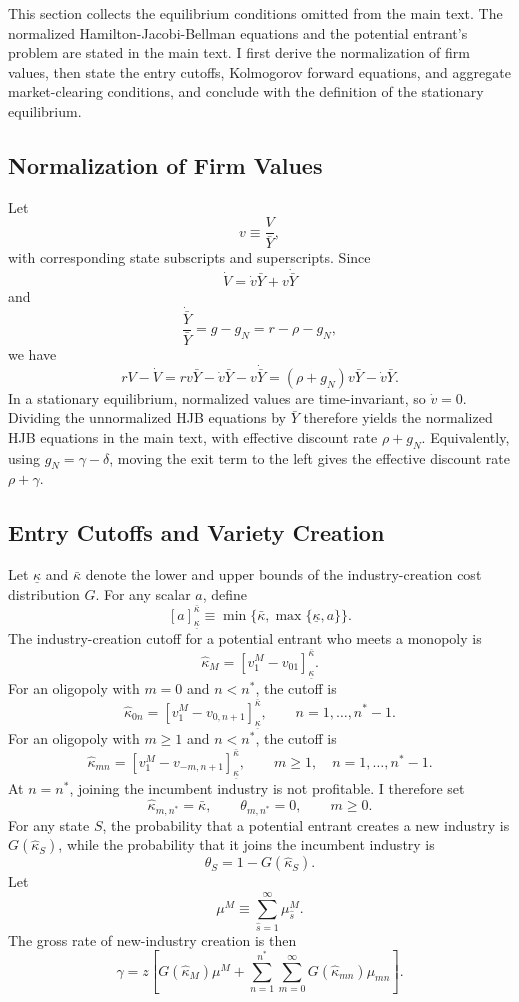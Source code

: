 \documentclass[12pt]{article}
\begin{document}
This section collects the equilibrium conditions omitted from the main text. The normalized Hamilton-Jacobi-Bellman equations and the potential entrant's problem are stated in the main text. I first derive the normalization of firm values, then state the entry cutoffs, Kolmogorov forward equations, and aggregate market-clearing conditions, and conclude with the definition of the stationary equilibrium.

\subsection{Normalization of Firm Values}\label{app:HJB_normalization}

Let
\[
v \equiv \frac{V}{\bar Y},
\]
with corresponding state subscripts and superscripts. Since
\[
\dot V=\dot v \bar Y+v\dot{\bar Y}
\]
and
\[
\frac{\dot{\bar Y}}{\bar Y}=g-g_N=r-\rho-g_N,
\]
we have
\[
rV-\dot V
=
rv\bar Y-\dot v\bar Y-v\dot{\bar Y}
=
(\rho+g_N)v\bar Y-\dot v\bar Y.
\]
In a stationary equilibrium, normalized values are time-invariant, so \(\dot v=0\).
Dividing the unnormalized HJB equations by \(\bar Y\) therefore yields the normalized
HJB equations in the main text, with effective discount rate \(\rho+g_N\). Equivalently,
using \(g_N=\gamma-\delta\), moving the exit term to the left gives the effective discount
rate \(\rho+\gamma\).

\subsection{Entry Cutoffs and Variety Creation}\label{app:entry_cutoffs}

Let \(\underline{\kappa}\) and \(\bar{\kappa}\) denote the lower and upper bounds of the
industry-creation cost distribution \(G\). For any scalar \(a\), define
\[
[a]_{\underline{\kappa}}^{\bar{\kappa}}
\equiv
\min\{\bar{\kappa},\max\{\underline{\kappa},a\}\}.
\]
The industry-creation cutoff for a potential entrant who meets a monopoly is
\[
\hat{\kappa}_M
=
[v^M_1-v_{01}]_{\underline{\kappa}}^{\bar{\kappa}}.
\]
For an oligopoly with \(m=0\) and \(n<n^*\), the cutoff is
\[
\hat{\kappa}_{0n}
=
[v^M_1-v_{0,n+1}]_{\underline{\kappa}}^{\bar{\kappa}},
\qquad n=1,\ldots,n^*-1.
\]
For an oligopoly with \(m\geq 1\) and \(n<n^*\), the cutoff is
\[
\hat{\kappa}_{mn}
=
[v^M_1-v_{-m,n+1}]_{\underline{\kappa}}^{\bar{\kappa}},
\qquad m\geq 1,\quad n=1,\ldots,n^*-1.
\]
At \(n=n^*\), joining the incumbent industry is not profitable. I therefore set
\[
\hat{\kappa}_{m,n^*}=\bar{\kappa},
\qquad
\theta_{m,n^*}=0,
\qquad m\geq 0.
\]
For any state \(S\), the probability that a potential entrant creates a new industry is
\(G(\hat{\kappa}_S)\), while the probability that it joins the incumbent industry is
\[
\theta_S=1-G(\hat{\kappa}_S).
\]
Let
\[
\mu^M \equiv \sum_{\hat s=1}^{\infty}\mu^M_{\hat s}.
\]
The gross rate of new-industry creation is then
\[
\gamma
=
z\left[
G(\hat{\kappa}_M)\mu^M
+
\sum_{n=1}^{n^*}\sum_{m=0}^{\infty}
G(\hat{\kappa}_{mn})\mu_{mn}
\right].
\]
\end{document}
